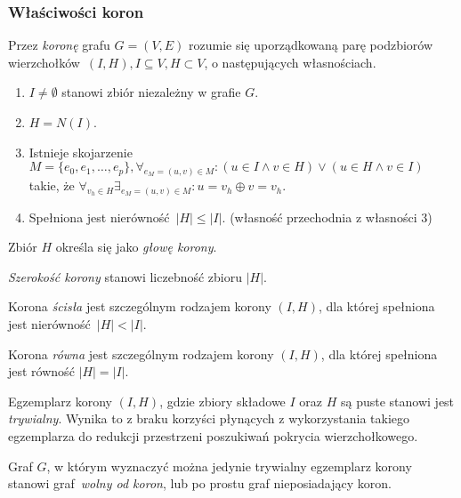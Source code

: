 \subsubsection{\textbf{Właściwości koron}}
\label{sss_kernelization_crown_main}
\begin{definition}
  Przez \emph{koronę} grafu $G=(V, E)$ rozumie się uporządkowaną parę podzbiorów wierzchołków $(I, H), I \subseteq V, H \subset V$, o następujących własnościach.
  \begin{enumerate}
    \item $I \neq \emptyset$ stanowi zbiór niezależny w grafie $G$.
    \item $H=N(I)$.
    \item Istnieje skojarzenie $M=\{e_0, e_1, \ldots, e_p\}, \forall_{e_M=(u,v) \in M}: (u\in I \land v\in H) \lor (u \in H \land v \in I)$ takie, że $\forall_{v_h \in H}\exists_{e_M=(u,v)\in M}: u = v_h \oplus v = v_h$.
    \item Spełniona jest nierówność $|H| \leq |I|$. (własność przechodnia z własności 3)
  \end{enumerate}
\end{definition}
\begin{definition}
  Zbiór $H$ określa się jako \emph{głowę korony}.
\end{definition}
\begin{definition}
  \emph{Szerokość korony} stanowi liczebność zbioru $|H|$.
\end{definition}
\begin{definition}
  Korona \emph{ścisła} jest szczególnym rodzajem korony $(I, H)$, dla której spełniona jest nierówność $|H| < |I|$.
\end{definition}
\begin{definition}
  Korona \emph{równa} jest szczególnym rodzajem korony $(I, H)$, dla której spełniona jest równość $|H| = |I|$.
\end{definition}
\begin{definition}
  Egzemplarz korony $(I, H)$, gdzie zbiory składowe $I$ oraz $H$ są puste stanowi jest \emph{trywialny}.
  Wynika to z braku korzyści płynących z wykorzystania takiego egzemplarza do redukcji przestrzeni poszukiwań pokrycia wierzchołkowego.
\end{definition}
\begin{definition}
  Graf $G$, w którym wyznaczyć można jedynie trywialny egzemplarz korony stanowi graf~\emph{wolny od koron}, lub po prostu graf nieposiadający koron.
\end{definition}
